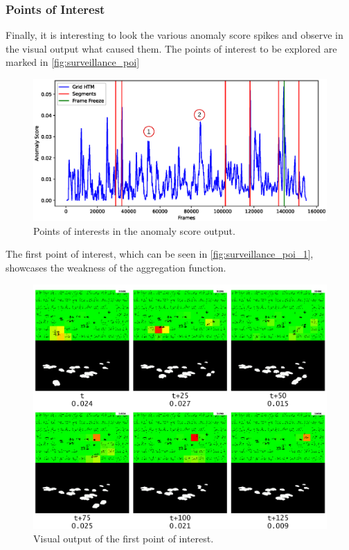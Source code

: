 \subsubsection{Points of Interest}
Finally, it is interesting to look the various anomaly score spikes and observe in the visual output what caused them. The points of interest to be explored are marked in \autoref{fig:surveillance_poi}
\begin{figure}[H]
    \centering
    \includegraphics[width=\textwidth]{resources/experiments/surveillance/surveillance_result_poi.eps}
    \caption[Points of Interest]{Points of interests in the anomaly score output.}
    \label{fig:surveillance_poi}
\end{figure}
The first point of interest, which can be seen in \autoref{fig:surveillance_poi_1}, showcases the weakness of the aggregation function.
\begin{figure}[H]
    \centering
    \includegraphics[width=\textwidth]{resources/experiments/surveillance/surveillance_poi_1.png}
    \caption[First POI]{Visual output of the first point of interest.}
    \label{fig:surveillance_poi_1}
\end{figure}
